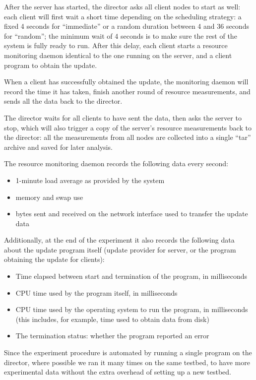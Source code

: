 \documentclass[a4paper,12pt]{article}
\begin{document}
After the server has started, the director asks all client nodes to
start as well: each client will first wait a short time depending on
the scheduling strategy: a fixed 4 seconds for ``immediate'' or a
random duration between 4 and 36 seconds for ``random''; the minimum
wait of 4 seconds is to make sure the rest of the system is fully
ready to run. After this delay, each client starts a resource monitoring
daemon identical to the one running on the server, and a client
program to obtain the update.

When a client has successfully obtained the update, the monitoring
daemon will record the time it has taken, finish another round of
resource measurements, and sends all the data back to the director.

The director waits for all clients to have sent the data, then asks the
server to stop, which will also trigger a copy of the server's resource
measurements back to the director: all the measurements from all nodes
are collected into a single ``tar'' archive and saved for later analysis.

The resource monitoring daemon records the following data every second:

\begin{itemize}
\item 1-minute load average as provided by the system
\item memory and swap use
\item bytes sent and received on the network interface used to
transfer the update data
\end{itemize}

Additionally, at the end of the experiment it also records the following
data about the update program itself (update provider for server, or
the program obtaining the update for clients):

\begin{itemize}
\item Time elapsed between start and termination of the program, in milliseconds
\item CPU time used by the program itself, in milliseconds
\item CPU time used by the operating system to run the program, in milliseconds
(this includes, for example, time used to obtain data from disk)
\item The termination status: whether the program reported an error
\end{itemize}

Since the experiment procedure is automated by running a single program
on the director, where possible we ran it many times on the same
testbed, to have more experimental data without the extra overhead
of setting up a new testbed.
\end{document}
